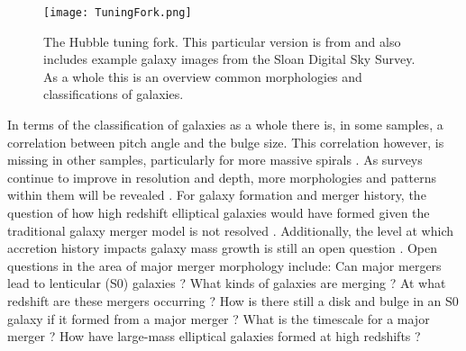 \documentclass[fleqn,usenatbib]{mnras}
\begin{document}
\begin{figure}
	\texttt{[image: TuningFork.png]}
    \caption{The Hubble tuning fork. This particular version is from \citet{Masters2025morphology} and also includes example galaxy images from the Sloan Digital Sky Survey. As a whole this is an overview common morphologies and classifications of galaxies.}
    \label{fig:TuningFork}
\end{figure}


In terms of the classification of galaxies as a whole there is, in some samples, a correlation between pitch angle and the bulge size. This correlation however, is missing in other samples, particularly for more massive spirals \citep{Masters2025morphology}. As surveys continue to improve in resolution and depth, more morphologies and patterns within them will be revealed \citep{Masters2025morphology}. For galaxy formation and merger history, the question of how high redshift elliptical galaxies would have formed given the traditional galaxy merger model is not resolved \citep{Duc2013}. Additionally, the level at which accretion history impacts galaxy mass growth is still an open question \citep{Duc2013}. 
Open questions in the area of major merger morphology include: Can major mergers lead to lenticular (S0) galaxies \citep{ElchieMoral2018}? What kinds of galaxies are merging \citep{Hopkins2008}? At what redshift are these mergers occurring \citep{Hopkins2008}? How is there still a disk and bulge in an S0 galaxy if it formed from a major merger \citep{Querejeta2014}? What is the timescale for a major merger \citep{Lotz2008}? How have large-mass elliptical galaxies formed at high redshifts \citep{Duc2013}? 

\end{document}
